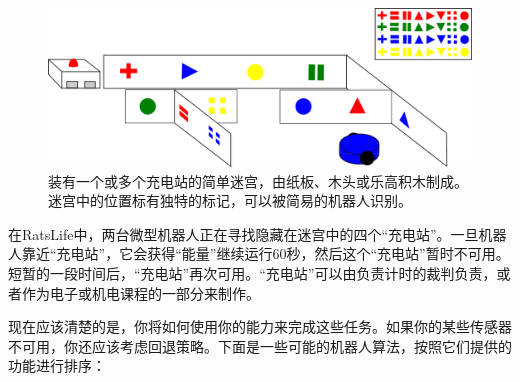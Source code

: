 \begin{figure}
	\centering
		\includegraphics[width=\textwidth]{figs/ratslife.png}
	\caption{装有一个或多个充电站的简单迷宫，由纸板、木头或乐高积木制成。迷宫中的位置标有独特的标记，可以被简易的机器人识别。}
	\label{fig:ratslife}
\end{figure}


在RatsLife中，两台微型机器人正在寻找隐藏在迷宫中的四个“充电站”。一旦机器人靠近“充电站”，它会获得“能量”继续运行60秒，然后这个“充电站”暂时不可用。短暂的一段时间后，“充电站”再次可用。“充电站”可以由负责计时的裁判负责，或者作为电子或机电课程的一部分来制作。


现在应该清楚的是，你将如何使用你的能力来完成这些任务。如果你的某些传感器不可用，你还应该考虑回退策略。下面是一些可能的机器人算法，按照它们提供的功能进行排序：


